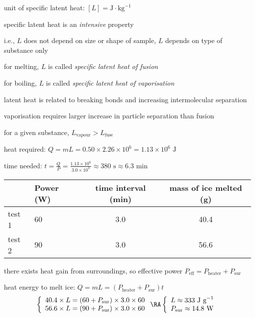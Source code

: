 \cmt unit of specific latent heat: $[L] = \text{J}\cdot\text{kg}^{-1}$

\cmt specific latent heat is an \emph{intensive} property

i.e., $L$ does not depend on size or shape of sample, $L$ depends on type of substance only 
	
\cmt for melting, $L$ is called \emph{specific latent heat of fusion}
	
for boiling, $L$ is called \emph{specific latent heat of vaporisation}
	
\cmt latent heat is related to breaking bonds and increasing intermolecular separation
	
vaporisation requires larger increase in particle separation than fusion
	
for a given substance, $L_\text{vapour}>L_\text{fuse}$


	
\sol heat required: $Q=mL = 0.50 \times 2.26 \times 10^6 = 1.13 \times 10^6 \text{ J}$
	
time needed: $t=\frac{Q}{P} = \frac{1.13 \times 10^6}{3.0\times 10^3} \approx 380 \text{ s} \approx 6.3 \text{ min}$ \eoe
 

\begin{center}
	\begin{tabular}{|C{1.6cm}|C{2cm}|c|c|}
		\hline  & Power (W) & time interval (min) & mass of ice melted (g) \\ 
		\hline test 1 & 60 & 3.0 & 40.4 \\ 
		\hline test 2 & 90 & 3.0 & 56.6 \\ 
		\hline 
	\end{tabular} 
\end{center}

\sol there exists heat gain from surroundings, so effective power $P_\text{eff}=P_\text{heater}+P_\text{sur}$

heat energy to melt ice: $Q = mL = (P_\text{heater}+P_\text{sur}) t$
\begin{equation*}
	\left\{ \begin{array}{l}
		40.4 \times L = (60+P_\text{sur})\times3.0\times60 \\
		56.6 \times L = (90+P_\text{sur})\times3.0\times60 
	\end{array}\right.
	\RA \left\{ \begin{array}{l}
	L \approx 333 \text{ J g}^{-1} \\
	P_\text{sur} \approx 14.8 \text{ W} \end{array}\right. 
\end{equation*}

